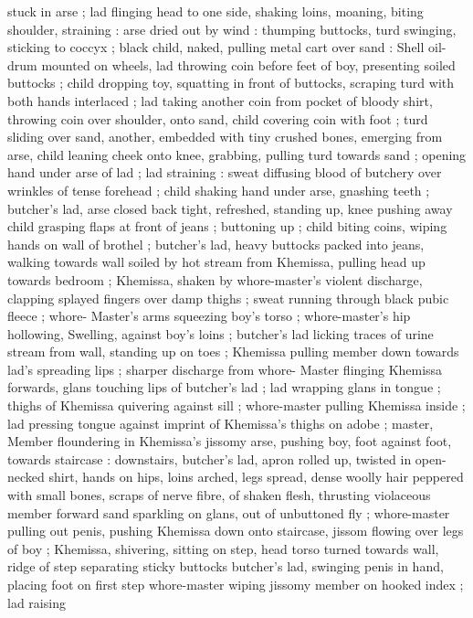 stuck in arse ; lad flinging head to one side, shaking loins, moaning,
biting shoulder, straining : arse dried out by wind : thumping
buttocks, turd swinging, sticking to coccyx ; black child, naked,
pulling metal cart over sand : Shell oil-drum mounted on wheels, lad
throwing coin before feet of boy, presenting soiled buttocks ; child
dropping toy, squatting in front of buttocks, scraping turd with both
hands interlaced ; lad taking another coin from pocket of bloody
shirt, throwing coin over shoulder, onto sand, child covering coin with
foot ; turd sliding over sand, another, embedded with tiny crushed
bones, emerging from arse, child leaning cheek onto knee, grabbing,
pulling turd towards sand ; opening hand under arse of lad ; lad
straining : sweat diffusing blood of butchery over wrinkles of tense
forehead ; child shaking hand under arse, gnashing teeth ; butcher's
lad, arse closed back tight, refreshed, standing up, knee pushing
away child grasping flaps at front of jeans ; buttoning up ; child
biting coins, wiping hands on wall of brothel ; butcher's lad, heavy
buttocks packed into jeans, walking towards wall soiled by hot stream
from Khemissa, pulling head up towards bedroom ; Khemissa, shaken
by whore-master’s violent discharge, clapping splayed fingers over
damp thighs ; sweat running through black pubic fleece ; whore-
Master's arms squeezing boy's torso ; whore-master's hip hollowing,
Swelling, against boy's loins ; butcher's lad licking traces of urine
stream from wall, standing up on toes ; Khemissa pulling member
down towards lad's spreading lips ; sharper discharge from whore-
Master flinging Khemissa forwards, glans touching lips of butcher's
lad ; lad wrapping glans in tongue ; thighs of Khemissa quivering
against sill ; whore-master pulling Khemissa inside ; lad pressing
tongue against imprint of Khemissa's thighs on adobe ; master,
Member floundering in Khemissa’s jissomy arse, pushing boy, foot
against foot, towards staircase : downstairs, butcher's lad, apron
rolled up, twisted in open-necked shirt, hands on hips, loins arched,
legs spread, dense woolly hair peppered with small bones, scraps of
nerve fibre, of shaken flesh, thrusting violaceous member forward
sand sparkling on glans, out of unbuttoned fly ; whore-master
pulling out penis, pushing Khemissa down onto staircase, jissom
flowing over legs of boy ; Khemissa, shivering, sitting on step, head
torso turned towards wall, ridge of step separating sticky buttocks
butcher's lad, swinging penis in hand, placing foot on first step
whore-master wiping jissomy member on hooked index ; lad raising
